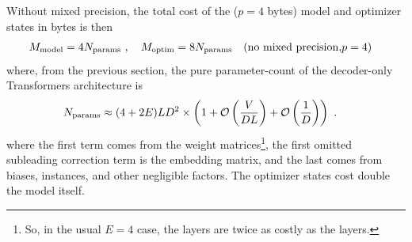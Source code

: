 \documentclass[11pt]{article}
\begin{document}
Without mixed precision, the total cost of the
 ($ p=4 $ bytes) model and optimizer states in bytes is then
\begin{align}
	M _{ \rm model} & = 4 N _{ \rm params } \ , \quad M_{ \rm  optim } = 8 N _{ \rm params }
	\quad ({\rm no \ mixed \ precision, } p=4)
	\label{eq_optimizer_states_mem_no_mp}
\end{align}
where, from the previous section, the pure parameter-count of the decoder-only Transformers
architecture is
\begin{align}
	N _{ \rm params } & \approx  (4 + 2E) L D ^{ 2 } \times \left ( 1 + \mathcal{O} \left( \frac{ V }{ DL }
		\right) + \mathcal{O} \left( \frac{ 1 }{ D } \right)  \right ) \ . \label{eq_approx_params_no_sharding}
\end{align}
where the first term comes from the  weight matrices\footnote{So,
	in the usual $ E=4 $ case, the  layers are twice as costly as the
	 layers.}, the first omitted subleading correction term is the embedding
matrix, and the last comes from biases,  instances, and other negligible
factors.  The optimizer states cost double the model itself.
\end{document}

